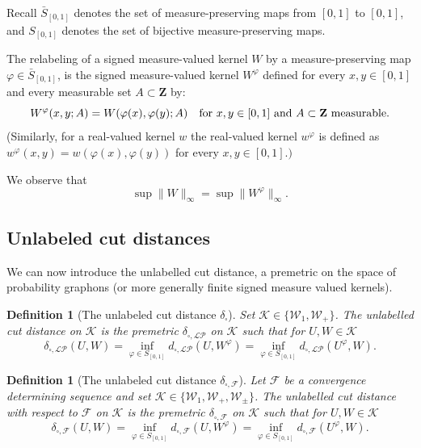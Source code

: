 \documentclass[11pt]{article}
\newtheorem{definition}[theorem]{Definition}
\newcommand{\cF}{{\mathcal F}}  %
\newcommand{\cK}{{\mathcal K}}  %
\newcommand{\Space}{\mathbf{Z}}
\newcommand{\signed}{\pm}
\newcommand{\Graphon}{\mathcal{W}_1}
\newcommand{\Kernel}{\mathcal{W}_{\signed}}
\newcommand{\Kernelp}{\mathcal{W}_{+}}
\newcommand{\InvRelabel}{S_{[0,1]}}
\newcommand{\Relabel}{\bar{S}_{[0,1]}}
\newcommand{\dd}{\delta_{\square}}
\begin{document}
\endproof


Recall $\Relabel$ denotes the set of measure-preserving maps from $[0, 1]$ to $[0, 1]$, and $\InvRelabel$ denotes the set of bijective measure-preserving maps.

The relabeling of a signed measure-valued kernel $W$ by a measure-preserving map $\varphi\in \Relabel$, is the signed measure-valued kernel $W^\varphi$ defined for every $x,y\in [0,1]$ and every measurable set $A\subset \Space$ by:
\[
  W^\varphi(x,y;A) = W(\varphi(x),\varphi(y);A)
  \quad \text{for $x,y\in [0,1]$ and $ A\subset \Space$ measurable}.
\]
(Similarly, for a real-valued kernel $w$ the real-valued kernel $w^{\varphi}$ is defined as $w^{\varphi}(x,y)=w(\varphi(x),\varphi(y))$ for every $x,y\in [0,1].)$

We observe that $$
\sup \|W\|_{\infty}=\sup \|W^{\varphi}\|_{\infty}.$$


\subsection{Unlabeled  cut distances}
	\label{subsection_unlabeled_cut_distance}
We can now introduce the unlabelled cut distance, a premetric on the space of probability graphons (or more generally finite signed measure valued kernels).

\begin{definition}[The unlabeled cut distance $\dd$]\label{def:ddcut}
  Set  $\cK\in\{\Graphon,  \Kernelp\}$. The \emph{unlabelled cut distance} on $\cK$ is the premetric $\delta_{\square,\mathcal{LP}}$ on $\cK$ such that for $U,W \in\cK$
\begin{equation}\label{def_ddcut}
\delta_{\square,\mathcal{LP}}(U,W) = \inf_{\varphi\in\InvRelabel} d_{\square,\mathcal{LP}}(U,W^\varphi)	
= \inf_{\varphi\in\InvRelabel} d_{\square,\mathcal{LP}}\left(U^{\varphi},W\right)		 .
\end{equation}
\end{definition}

\begin{definition}[The unlabeled cut distance $\delta_{\square,\cF}$]\label{def:ddcut_cF}
Let $\cF$ be a convergence determining sequence and set $\cK\in\{\Graphon,  \Kernelp,  \Kernel\}$. The \emph{unlabelled cut distance} with respect to $\cF$ on $\cK$ is the premetric $\delta_{\square,\cF}$ on $\cK$ such that for $U,W \in\cK$ \begin{equation}\label{def_ddcut_cF}
\delta_{\square,\cF}(U,W) = \inf_{\varphi\in\InvRelabel} d_{\square,\cF}(U,W^\varphi)	
= \inf_{\varphi\in\InvRelabel} d_{\square,\cF}\left(U^{\varphi},W\right)		 .
\end{equation}
\end{definition}
\end{document}
